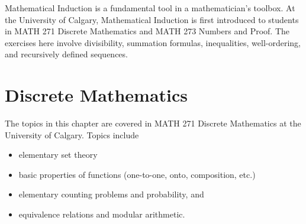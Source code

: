 \documentclass[12pt]{book}
\begin{document}
Mathematical Induction is a fundamental tool in a mathematician's toolbox.  At the University of Calgary, Mathematical Induction is first introduced to students in MATH 271 Discrete Mathematics and MATH 273 Numbers and Proof.
The exercises here involve divisibility, summation formulas, inequalities, well-ordering, and recursively defined sequences.


\chapter{Discrete Mathematics}\label{ch-discrete}
The topics in this chapter are covered in MATH 271 Discrete Mathematics at the University of Calgary.
Topics include
\begin{itemize}
	\item elementary set theory	
	\item basic properties of functions (one-to-one, onto, composition, etc.)
	\item elementary counting problems and probability, and
	\item equivalence relations and modular arithmetic.
\end{itemize}

\end{document}
